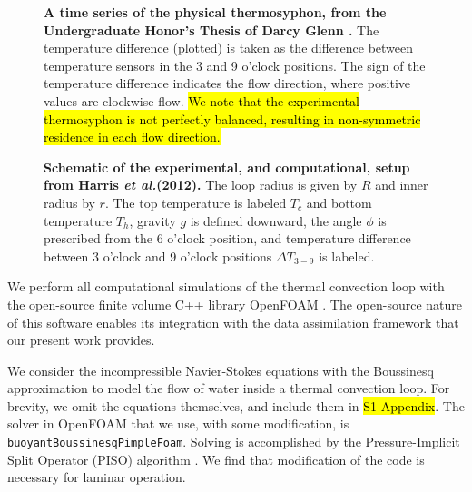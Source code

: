 \documentclass[10pt,letterpaper]{article}
\newcommand{\etal}{\textit{et al.}}
\begin{document}
\begin{figure}[h]
  \centering
  \caption[A time series of the physical thermosyphon, from the Undergraduate Honor's Thesis of Darcy Glenn {\protect \cite{glenn2013}}]{
\textbf{    A time series of the physical thermosyphon, from the Undergraduate Honor's Thesis of Darcy Glenn {\protect \cite{glenn2013}}.
}    The temperature difference (plotted) is taken as the difference between temperature sensors in the 3 and 9 o'clock positions.
     The sign of the temperature difference indicates the flow direction, where positive values are clockwise flow.
     \hl{We note that the experimental thermosyphon is not perfectly balanced, resulting in non-symmetric residence in each flow direction.}
      }
  \label{fig:thermosyphon-physical-timeseries}
\end{figure}

\begin{figure}[h]
  \centering
  \caption[Schematic of the experimental, and computational, setup from Harris \etal (2012)]{
\textbf{    Schematic of the experimental, and computational, setup from Harris \etal (2012).
}    The loop radius is given by $R$ and inner radius by $r$.
    The top temperature is labeled $T_c$ and bottom temperature $T_h$, gravity $g$ is defined downward, the angle $\phi$ is prescribed from the 6 o'clock position, and temperature difference between 3 o'clock and 9 o'clock positions $\Delta T_{3-9}$ is labeled.
  }
  \label{fig:thermosyphon-schematic}
\end{figure}

We perform all computational simulations of the thermal convection loop with the open-source finite volume C++ library OpenFOAM \cite{jasak2007}.
The open-source nature of this software enables its integration with the data assimilation framework that our present work provides.

We consider the incompressible Navier-Stokes equations with the Boussinesq approximation to model the flow of water inside a thermal convection loop.
For brevity, we omit the equations themselves, and include them in \hl{S1 Appendix}.
The solver in OpenFOAM that we use, with some modification, is \verb|buoyantBoussinesqPimpleFoam|.
Solving is accomplished by the Pressure-Implicit Split Operator (PISO) algorithm \cite{issa1986solution}.
We find that modification of the code is necessary for laminar operation.
\end{document}
